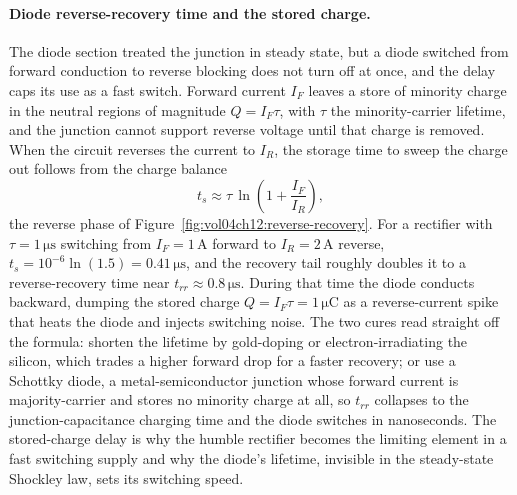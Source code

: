 \paragraph{Diode reverse-recovery time and the stored charge.}
The diode section treated the junction in steady state, but a diode switched
from forward conduction to reverse blocking does not turn off at once, and the
delay caps its use as a fast switch. Forward current $I_F$ leaves a store of
minority charge in the neutral regions of magnitude $Q = I_F\tau$, with $\tau$
the minority-carrier lifetime, and the junction cannot support reverse voltage
until that charge is removed. When the circuit reverses the current to $I_R$, the
storage time to sweep the charge out follows from the charge balance
\[
t_s \approx \tau\,\ln\!\left(1 + \frac{I_F}{I_R}\right),
\]
the reverse phase of Figure~\ref{fig:vol04ch12:reverse-recovery}. For a
rectifier with $\tau = 1\,\si{\micro\second}$ switching from $I_F = 1\,\si{
\ampere}$ forward to $I_R = 2\,\si{\ampere}$ reverse, $t_s = 10^{-6}\ln(1.5) =
0.41\,\si{\micro\second}$, and the recovery tail roughly doubles it to a
reverse-recovery time near $t_{rr} \approx 0.8\,\si{\micro\second}$. During that
time the diode conducts backward, dumping the stored charge $Q = I_F\tau =
1\,\si{\micro\coulomb}$ as a reverse-current spike that heats the diode and
injects switching noise. The two cures read straight off the formula: shorten the
lifetime by gold-doping or electron-irradiating the silicon, which trades a higher
forward drop for a faster recovery; or use a Schottky diode, a metal-semiconductor
junction whose forward current is majority-carrier and stores no minority charge
at all, so $t_{rr}$ collapses to the junction-capacitance charging time and the
diode switches in nanoseconds. The stored-charge delay is why the humble rectifier
becomes the limiting element in a fast switching supply and why the diode's
lifetime, invisible in the steady-state Shockley law, sets its switching speed.



